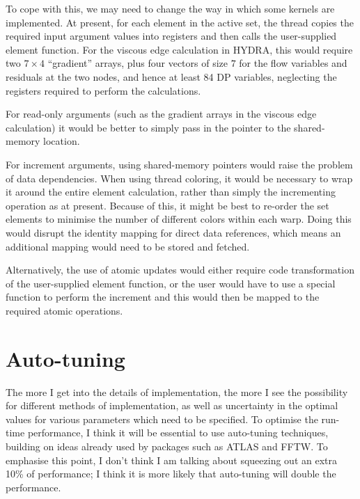 \documentclass[12pt]{article}
\begin{document}
To cope with this, we may need to change the way in which some kernels 
are implemented.  At present, for each element in the active set, 
the thread copies the required input argument values into registers
and then calls the user-supplied element function.  For the viscous 
edge calculation in HYDRA, this would require two $7\!\times\! 4$
``gradient'' arrays, plus four vectors of size $7$ for the flow 
variables and residuals at the two nodes, and hence at least 84 
DP variables, neglecting the registers required to perform the 
calculations.

For read-only arguments (such as the gradient arrays in the viscous 
edge calculation) it would be better to simply pass in the pointer
to the shared-memory location.

For increment arguments, using shared-memory pointers would raise 
the problem of data dependencies.  When using thread coloring, it 
would be necessary to wrap it around the entire element calculation,
rather than simply the incrementing operation as at present. Because 
of this, it might be best to re-order the set elements to minimise
the number of different colors within each warp.  Doing this would
disrupt the identity mapping for direct data references, which means
an additional mapping would need to be stored and fetched.

Alternatively, the use of atomic updates would either require code 
transformation of the user-supplied element function, or the user 
would have to use a special function to perform the increment and 
this would then be mapped to the required atomic operations.

\newpage

\section{Auto-tuning}

The more I get into the details of implementation, the more I see
the possibility for different methods of implementation, as well
as uncertainty in the optimal values for various parameters which
need to be specified.   To optimise the run-time performance, I 
think it will be essential to use auto-tuning techniques, building 
on ideas already used by packages such as ATLAS and FFTW.  To
emphasise this point, I don't think I am talking about squeezing 
out an extra 10\% of performance; I think it is more likely that
auto-tuning will double the performance.
\end{document}
